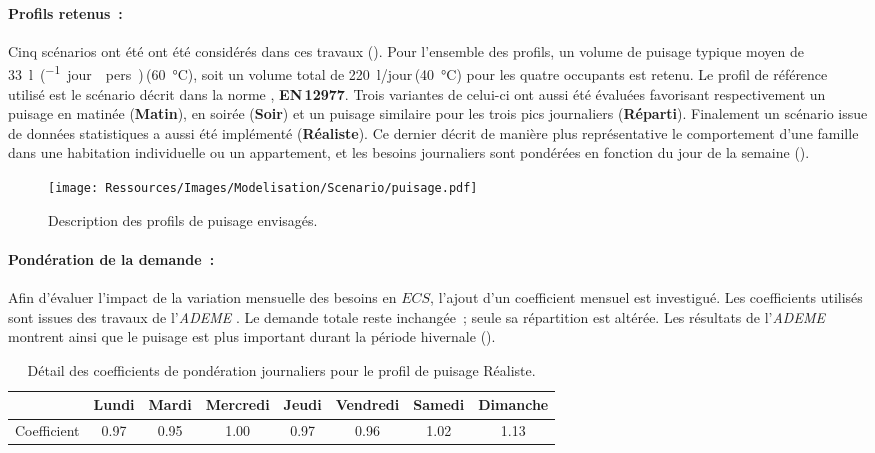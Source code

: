 \paragraph{Profils retenus~:} %
\label{par:profils_retenus}
Cinq scénarios ont été ont été considérés dans ces travaux ().
Pour l’ensemble des profils, un volume de puisage typique moyen de
\SI{33}{\litre\per(jour\period pers)}\,(\SI{60}{\celsius}), soit un
volume total de \SI{220}{\litre/jour}\,(\SI{40}{\celsius}) pour les quatre occupants est
retenu. Le profil de référence utilisé est le scénario décrit dans la norme
\textcite{EN129771}, \textbf{EN\,12977}. Trois variantes de celui-ci ont aussi été évaluées favorisant
respectivement un puisage en matinée (\textbf{Matin}), en soirée (\textbf{Soir}) et un
puisage similaire pour les trois pics journaliers (\textbf{Réparti}). Finalement un scénario
issue de données statistiques \parencite{ADEME2016} a aussi été implémenté
(\textbf{Réaliste}). Ce dernier décrit de manière plus représentative le comportement
d’une famille dans une habitation individuelle ou un appartement, et les besoins
journaliers sont pondérées en fonction du jour de la semaine ().
\begin{figure}
    \centering
    \texttt{[image: Ressources/Images/Modelisation/Scenario/puisage.pdf]}
    \caption{Description des profils de puisage envisagés.
             \label{fig:profil_puisage}}
\end{figure}

\paragraph{Pondération de la demande~:} %
\label{par:ponderation_de_la_demande}
Afin d’évaluer l’impact de la variation mensuelle des besoins en $ECS$, l’ajout d’un
coefficient mensuel est investigué. Les coefficients utilisés sont issues des travaux de
l’\textit{ADEME} \parencite{ADEME2016}. Le demande totale reste inchangée~; seule sa
répartition est altérée. Les résultats de l’\textit{ADEME} montrent ainsi que le puisage est plus
important durant la période hivernale ().

\begin{table}
\centering
\caption{Détail des coefficients de pondération journaliers pour le profil de
         puisage Réaliste.}
\label{tab:coef_semaine}
\begin{tabular}{l*{7}{c}}
    \toprule
                & Lundi & Mardi & Mercredi & Jeudi & Vendredi & Samedi & Dimanche \\
    \midrule
    Coefficient & \num{0.97}  & \num{0.95}  & \num{1.00}     & \num{0.97}  & \num{0.96}     & \num{1.02}   & \num{1.13}     \\
    \bottomrule
\end{tabular}
\end{table}

